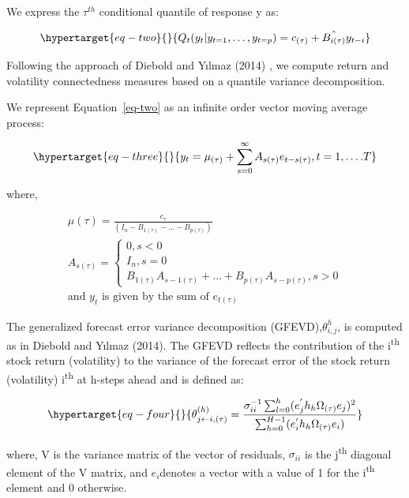 \documentclass[
  letterpaper,
  DIV=11,
  numbers=noendperiod]{scrartcl}
\begin{document}
We express the \(\tau^{th}\) conditional quantile of response y as:

\begin{equation}\protect\hypertarget{eq-two}{}{
Q_t(y_t |y_{t=1},\dots,y_{t=p})=c_{(\tau)}+\hat{B_{i(\tau)}} y_{t-i}
}\label{eq-two}\end{equation}

Following the approach of Diebold and Yılmaz (2014) , we compute return
and volatility connectedness measures based on a quantile variance
decomposition.

We represent Equation~\ref{eq-two} as an infinite order vector moving
average process:

\begin{equation}\protect\hypertarget{eq-three}{}{
y_t=\mu_{(\tau)}+\sum_{s=0}^{\infty}A_{s(\tau)}e_{t-s(\tau)}, t=1,\dots.T
}\label{eq-three}\end{equation}

where,

\begin{align*}
\mu{(\tau)}= \frac{c_{\tau}}{\left (I_n-B_{1(\tau)}-\dots-B_{p(\tau)} \right)} \\
A_{s(\tau)}= \begin{cases} 0, s<0 \\ I_n, s=0 \\ B_{1(\tau)}A_{s-1(\tau)}+\dots+B_{p(\tau)}A_{s-p(\tau)}, s>0 \end{cases} \\
\text{and $y_t$ is given by the sum of $e_{t(\tau)}$}
\end{align*}

The generalized forecast error variance decomposition
(GFEVD),\(\theta^h_{i,j}\), is computed as in Diebold and Yılmaz (2014).
The GFEVD reflects the contribution of the i\textsuperscript{th} stock
return (volatility) to the variance of the forecast error of the stock
return (volatility) i\textsuperscript{th} at h-steps ahead and is
defined as:

\begin{equation}\protect\hypertarget{eq-four}{}{
\theta^{(h)}_{j \leftarrow i,(\tau)}= \frac{\sigma_{ii}^{-1}\sum_{l=0}^{h}(e_j^{'}h_h \Omega_{(\tau)} e_j)^2}{\sum_{h=0}^{H-1}(e_i^{'}h_h \Omega_{(\tau)} e_i)}
}\label{eq-four}\end{equation}

where, V is the variance matrix of the vector of residuals,
\(\sigma_{ii}\) is the j\textsuperscript{th} diagonal element of the V
matrix, and \(e_i\)denotes a vector with a value of 1 for the
i\textsuperscript{th} element and 0 otherwise.
\end{document}
